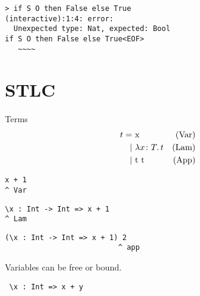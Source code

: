 \documentclass{beamer}
\begin{document}
\begin{frame}[fragile]
\begin{verbatim}
> if S O then False else True
(interactive):1:4: error: 
  Unexpected type: Nat, expected: Bool
if S O then False else True<EOF>
   ~~~~
\end{verbatim}
\end{frame} 

\section{STLC}

\begin{frame}[c]
  Terms
  \begin{displaymath}
    \begin{aligned}
t =& \ \text{x} & \text{(Var)}\\
  |& \ \lambda x \colon T \ldotp t & \text{(Lam)}\\
  |& \ \text{t t} & \text{(App)}
    \end{aligned}
  \end{displaymath}
\end{frame}

\begin{frame}[fragile]
  \begin{verbatim}
x + 1
^ Var
  \end{verbatim}  
\end{frame}

\begin{frame}[fragile]
  \begin{verbatim}
\x : Int -> Int => x + 1
^ Lam
  \end{verbatim}  
\end{frame}

\begin{frame}[fragile]
  \begin{verbatim}
(\x : Int -> Int => x + 1) 2
                          ^ app
  \end{verbatim}  
\end{frame}

\begin{frame}[fragile]
  \begin{center}
   Variables can be free or bound.
  \end{center}
  \begin{verbatim}
 \x : Int => x + y
  \end{verbatim}  
\end{frame}
\end{document}
